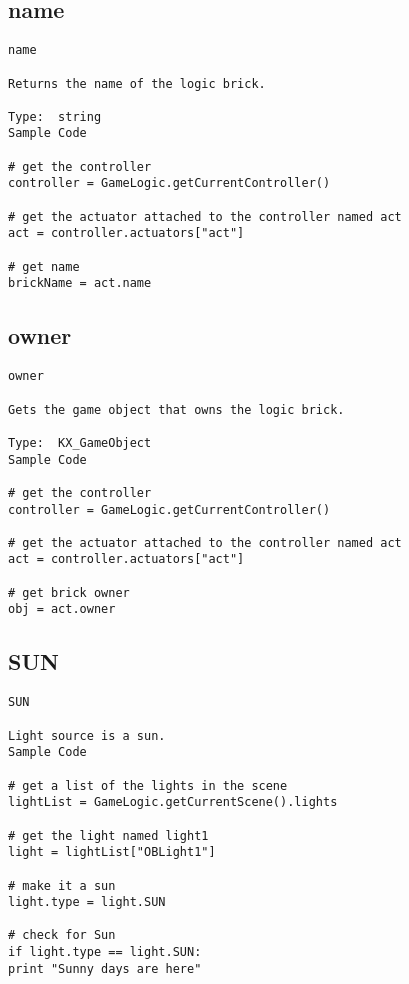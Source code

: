\subsection{name}
\begin{verbatim}
name

Returns the name of the logic brick.

Type:  string
Sample Code

# get the controller
controller = GameLogic.getCurrentController()

# get the actuator attached to the controller named act
act = controller.actuators["act"]

# get name
brickName = act.name
\end{verbatim}

\subsection{owner}
\begin{verbatim}
owner

Gets the game object that owns the logic brick.

Type:  KX_GameObject
Sample Code

# get the controller
controller = GameLogic.getCurrentController()

# get the actuator attached to the controller named act
act = controller.actuators["act"]

# get brick owner
obj = act.owner
\end{verbatim}

\subsection{SUN}
\begin{verbatim}
SUN

Light source is a sun.
Sample Code

# get a list of the lights in the scene
lightList = GameLogic.getCurrentScene().lights

# get the light named light1
light = lightList["OBLight1"]

# make it a sun
light.type = light.SUN

# check for Sun
if light.type == light.SUN:
print "Sunny days are here"
\end{verbatim}
